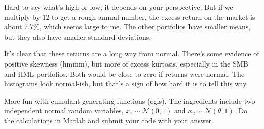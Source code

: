 \documentclass[11pt]{exam}
\begin{document}
\begin{questions}
\begin{solution}
\begin{parts}
\item Hard to say what's high or low, it depends on your perspective.
But if we multiply by 12 to get a rough annual number,
the excess return on the market is about 7.7\%, which seems large to me.
The other portfolios have smaller means, but they also have smaller standard deviations.

\item It's clear that these returns are a long way from normal.
There's some evidence of positive skewness (hmmm),
but more of excess kurtosis,
especially in the SMB and HML portfolios.
Both would be close to zero if returns were normal.
The histograms look normal-ish, but that's a sign of how hard it is
to tell this way.

\end{parts}
\end{solution}


More fun with cumulant generating functions (cgfs).
The ingredients include two independent normal random variables,
$ x_1 \sim \mathcal{N}(0,1)$ and $ x_2 \sim \mathcal{N}(\theta,1)$.
Do the calculations in Matlab and submit your code with your answer.
%


\end{questions}
\end{document}
